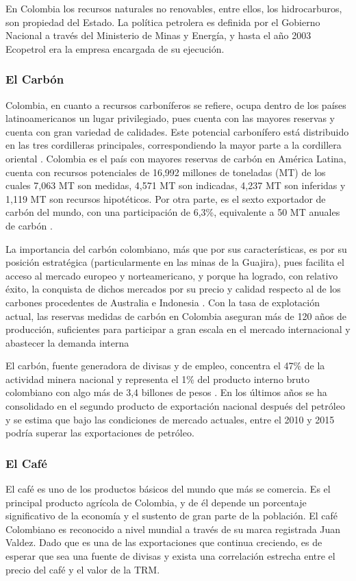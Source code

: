 En Colombia los recursos naturales no renovables, entre ellos, los hidrocarburos, son propiedad del Estado. La política petrolera es definida por el Gobierno Nacional a través del Ministerio de Minas y Energía, y hasta el año 2003 Ecopetrol era la empresa encargada de su ejecución. 

\subsubsection{El Carbón}
Colombia, en cuanto a recursos carboníferos se refiere, ocupa dentro de los países latinoamericanos un lugar privilegiado, pues cuenta con las mayores reservas y cuenta con gran variedad de calidades. Este potencial carbonífero está distribuido en las tres cordilleras principales, correspondiendo la mayor parte a la cordillera oriental \cite{cardenas}. Colombia es el país con mayores reservas de carbón en América Latina, cuenta con recursos potenciales de 16,992 millones de toneladas (MT) de los cuales 7,063 MT son medidas, 4,571 MT son indicadas, 4,237 MT son inferidas y 1,119 MT son recursos hipotéticos. Por otra parte, es el sexto exportador de carbón del mundo, con una participación de 6,3\%, equivalente a 50 MT anuales de carbón \cite{carbonMain}. 

La importancia del carbón colombiano, más que por sus características, es por su posición estratégica (particularmente en las minas de la Guajira), pues facilita el acceso al mercado europeo y norteamericano, y porque ha logrado, con relativo éxito, la conquista de dichos mercados por su precio y calidad respecto al de los carbones procedentes de Australia e Indonesia \cite{cardenas}. Con la tasa de explotación actual, las reservas medidas de carbón en Colombia aseguran más de 120 años de producción, suficientes para participar a gran escala en el mercado internacional y abastecer la demanda interna \cite{carbonMain}

El carbón, fuente generadora de divisas y de empleo, concentra el 47\% de la actividad minera nacional y representa el 1\% del producto interno bruto colombiano con algo más de 3,4 billones de pesos \cite{carbonMain}. En los últimos años se ha consolidado en el segundo producto de exportación nacional  después del petróleo y se estima que bajo las condiciones de mercado actuales, entre el 2010 y 2015 podría superar las exportaciones de petróleo.

\subsubsection{El Café}
El café es uno de los productos básicos del mundo que más se comercia. Es el principal producto agrícola de Colombia, y de él depende un porcentaje significativo de la economía y el sustento de gran parte de la población. El café Colombiano es reconocido a nivel mundial a través de su marca registrada Juan Valdez. Dado que es una de las exportaciones que continua creciendo, es de esperar que sea una fuente de divisas y exista una correlación estrecha entre el precio del café y el valor de la TRM. 

